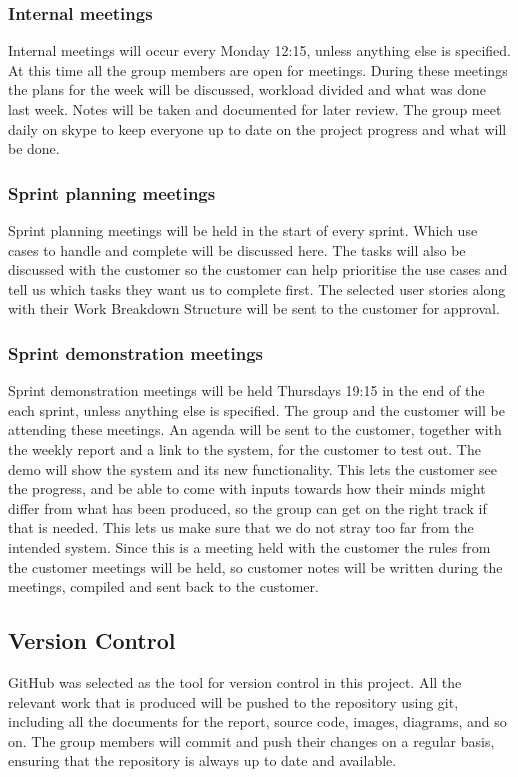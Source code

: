 \subsubsection{Internal meetings}
Internal meetings will occur every Monday 12:15, unless anything else is specified. At this time all the group members are open for meetings. During these meetings the plans for the week will be discussed, workload divided and what was done last week. Notes will be taken and documented for later review. The group meet daily on skype to keep everyone up to date on the project progress and what will be done.

\subsubsection{Sprint planning meetings}
Sprint planning meetings will be held in the start of every sprint. Which use cases to handle and complete will be discussed here. The tasks will also be discussed with the customer so the customer can help prioritise the use cases and tell us which tasks they want us to complete first. The selected user stories along with their Work Breakdown Structure will be sent to the customer for approval.

\subsubsection{Sprint demonstration meetings}
Sprint demonstration meetings will be held Thursdays 19:15 in the end of the each sprint, unless anything else is specified. The group and the customer will be attending these meetings. An agenda will be sent to the customer, together with the weekly report and a link to the system, for the customer to test out. The demo will show the system and its new functionality. This lets the customer see the progress, and be able to come with inputs towards how their minds might differ from what has been produced, so the group can get on the right track if that is needed. This lets us make sure that we do not stray too far from the intended system. Since this is a meeting held with the customer the rules from the customer meetings will be held, so customer notes will be written during the meetings, compiled and sent back to the customer.

\subsection{Version Control}
GitHub was selected as the tool for version control in this project. All the relevant work that is produced will be pushed to the repository using git, including all the documents for the report, source code, images, diagrams, and so on. The group members will commit and push their changes on a regular basis, ensuring that the repository is always up to date and available.

